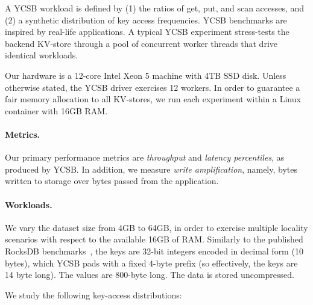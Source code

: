 A YCSB workload is defined by  (1) the ratios of get, put, and scan accesses, 
and (2) a synthetic distribution of key access frequencies. 
YCSB  benchmarks  are inspired by real-life applications.
A typical YCSB experiment stress-tests the backend KV-store through a pool of concurrent worker threads that drive identical
workloads. %

Our hardware is a 12-core Intel Xeon 5 machine with 4TB SSD disk. Unless otherwise stated, the YCSB driver  
exercises 12 workers. In order to guarantee a fair memory allocation to all KV-stores, 
we run each experiment within a Linux container with 16GB RAM. 

\paragraph{Metrics.} Our primary performance metrics are \emph{throughput} 
and \emph{latency percentiles}, as produced by YCSB. 
In addition, we measure \emph{write amplification}, namely, bytes written to storage over bytes passed from the application. 

\paragraph{Workloads.} 
We vary the dataset size from 4GB to 64GB, in order to exercise multiple locality 
scenarios with respect to the available 16GB of RAM. Similarly to the published RocksDB benchmarks~\cite{RocksDBPerf}, 
the keys are 32-bit integers encoded in decimal form (10 bytes), which YCSB pads with a fixed 4-byte prefix (so effectively, 
the keys are 14 byte long). The values are 800-byte long. The data is stored uncompressed. 

We study the following key-access distributions:  


